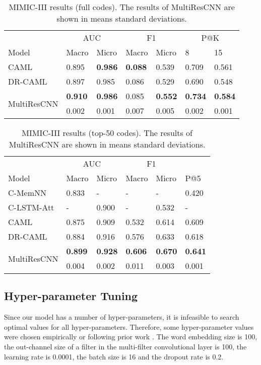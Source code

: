 \documentclass[letterpaper]{article} \usepackage{aaai20}  \usepackage{times}  \usepackage{helvet} \usepackage{courier}  \usepackage[hyphens]{url}  \usepackage{graphicx} \urlstyle{rm} \def\UrlFont{\rm}  \usepackage{graphicx}  \frenchspacing  \setlength{\pdfpagewidth}{8.5in}  \setlength{\pdfpageheight}{11in}
\begin{document}
\begin{table*}[t]
\centering
\caption{MIMIC-III results (full codes). The results of MultiResCNN are shown in means  standard deviations.}\smallskip
\begin{tabular}{l|ll|ll|ll}
\hline
& \multicolumn{2}{|c|}{AUC} & \multicolumn{2}{|c|}{F1} & \multicolumn{2}{|c}{P@K} \\
Model & Macro & Micro & Macro & Micro &  8 & 15 \\
\hline
CAML \cite{mullenbach2018explainable} & 0.895 & \textbf{0.986} & \textbf{0.088} & 0.539 &  0.709 & 0.561 \\
DR-CAML \cite{mullenbach2018explainable} & 0.897 & 0.985 & 0.086 & 0.529 & 0.690 & 0.548 \\
\hline
\multirow{2}{*}{MultiResCNN}  & \textbf{0.910} & \textbf{0.986} & 0.085 & \textbf{0.552} & \textbf{0.734} & \textbf{0.584} \\
 & 0.002 & 0.001 & 0.007 & 0.005 & 0.002 & 0.001 \\
\hline
\end{tabular}
\label{table:mimic3full}
\end{table*}

\begin{table*}[t]
\centering
\caption{MIMIC-III results (top-50 codes). The results of MultiResCNN are shown in means  standard deviations.}\smallskip
\begin{tabular}{l|ll|ll|l}
\hline
& \multicolumn{2}{|c|}{AUC} & \multicolumn{2}{|c|}{F1} &  \\
Model & Macro & Micro & Macro & Micro & P@5 \\
\hline
C-MemNN \cite{prakash2017condensed} & 0.833 & - & - & - & 0.420 \\
C-LSTM-Att \cite{shi2017towards} & - & 0.900 & - & 0.532 & - \\
CAML \cite{mullenbach2018explainable} & 0.875 & 0.909 & 0.532 & 0.614 & 0.609  \\
DR-CAML \cite{mullenbach2018explainable} & 0.884 & 0.916 & 0.576 & 0.633 & 0.618  \\
\hline
\multirow{2}{*}{MultiResCNN}  & \textbf{0.899}  & \textbf{0.928} & \textbf{0.606} & \textbf{0.670} &  \textbf{0.641} \\
& 0.004  & 0.002 & 0.011 & 0.003 &  0.001 \\
\hline
\end{tabular}
\label{table:mimic3_50}
\end{table*}

\subsection{Hyper-parameter Tuning}
Since our model has a number of hyper-parameters, it is infeasible to search optimal values for all hyper-parameters. Therefore, some hyper-parameter values were chosen empirically or following prior work \cite{mullenbach2018explainable}. The word embedding size  is 100, the out-channel size  of a filter in the multi-filter convolutional layer is 100, the learning rate is 0.0001, the batch size is 16 and the dropout rate is 0.2. 
\end{document}
